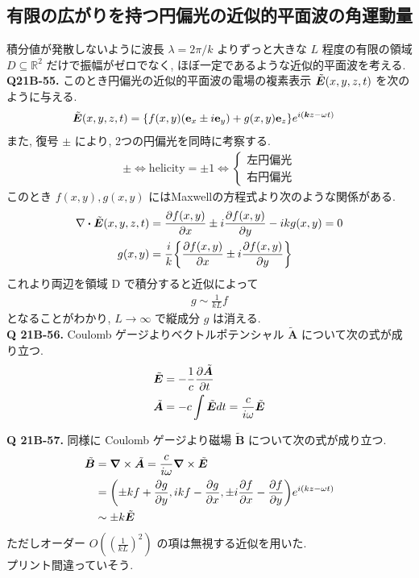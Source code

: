 \documentclass[uplatex,dvipdfmx,a4paper,11pt]{jlreq}
\newcommand{\RR}{\mathbb{R}}
\newcommand{\BB}{\bm{B}}
\renewcommand{\AA}{\bm{A}}
\newcommand{\kk}{\bm{k}}
\theoremstyle{definition}
\begin{document}
\subsection{有限の広がりを持つ円偏光の近似的平面波の角運動量}
積分値が発散しないように波長 $\lambda=2\pi/k$ よりずっと大きな $L$ 程度の有限の領域 $D\subseteq\RR^2$ だけで振幅がゼロでなく, ほぼ一定であるような近似的平面波を考える. \\

\textbf{Q21B-55.}
このとき円偏光の近似的平面波の電場の複素表示 $\tilde{\bm{E}}(x,y,z,t)$ を次のように与える.
\begin{align}
  \ET(x,y,z,t) & = \qty{f(x,y)(\vb{e}_x\pm i\vb{e}_y) + g(x,y)\vb{e}_z}e^{i(\kk z-\omega t)} \label{def ET D}
\end{align}
また, 復号 $\pm$ により, 2つの円偏光を同時に考察する.
\begin{align}
  \pm\iff \mathrm{helicity} = \pm 1 \iff \begin{cases}
                                           左円偏光 \\
                                           右円偏光
                                         \end{cases}
\end{align}
このとき $f(x,y), g(x,y)$ にはMaxwellの方程式より次のような関係がある.
\begin{align}
  \nabla\vdot\ET(x,y,z,t) & = \pdv{f(x,y)}{x}\pm i\pdv{f(x,y)}{y} - i kg(x,y) = 0  \\
  g(x,y)                  & = \frac{i}{k}\qty{\pdv{f(x,y)}{x}\pm i\pdv{f(x,y)}{y}}
\end{align}
これより両辺を領域 D で積分すると近似によって
\begin{align}
  g\sim\frac{1}{kL}f
\end{align}
となることがわかり, $L\to\infty$ で縦成分 $g$ は消える. \\

\textbf{Q 21B-56.}
Coulomb ゲージよりベクトルポテンシャル $\tilde{\AA}$ について次の式が成り立つ.
\begin{align}
  \ET         & = -\frac{1}{c}\pdv{\tilde{\AA}}{t}    \\
  \tilde{\AA} & = -c\int\ET dt = \frac{c}{i\omega}\ET
\end{align}

\textbf{Q 21B-57.}
同様に Coulomb ゲージより磁場 $\tilde{\BB}$ について次の式が成り立つ.
\begin{align}
  \tilde{\BB} & = \vnabla\times\tilde{\AA} = \frac{c}{i\omega}\vnabla\times\ET                               \\
              & = \qty(\pm kf + \pdv{g}{y}, ikf -\pdv{g}{x}, \pm i\pdv{f}{x} - \pdv{f}{y})e^{i(kz-\omega t)} \\
              & \sim \pm k\ET
\end{align}
ただしオーダー $O((\frac{1}{kL})^2)$ の項は無視する近似を用いた. \\
プリント間違っていそう. \\
\end{document}
